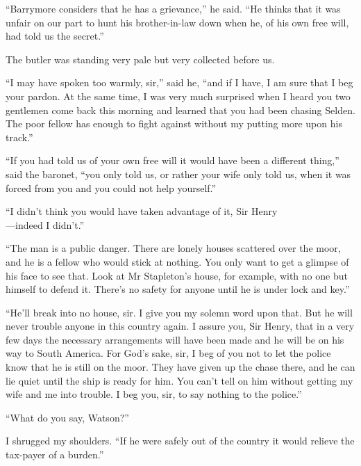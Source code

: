 \documentclass[paper=5.5in:8.5in,BCOR=7mm,twoside,DIV=calc,12pt,usegeometry,openany,chapterprefix,endperiod,headings=big]{scrbook} %
\begin{document}
\enquote{Barrymore considers that he has a grievance,} he said. \enquote{He thinks that it was unfair on our part to hunt his brother-in-law down when he, of his own free will, had told us the secret.}

The butler was standing very pale but very collected before us.


\enquote{I may have spoken too warmly, sir,} said he, \enquote{and if I have, I am sure that I beg your pardon. At the same time, I was very much surprised when I heard you two gentlemen come back this morning and learned that you had been chasing Selden. The poor fellow has enough to fight against without my putting more upon his track.}

\enquote{If you had told us of your own free will it would have been a different thing,} said the baronet, \enquote{you only told us, or rather your wife only told us, when it was forced from you and you could not help yourself.}

\enquote{I didn't think you would have taken advantage of it, Sir Henry\\ ---indeed I didn't.}

\enquote{The man is a public danger. There are lonely houses scattered over the moor, and he is a fellow who would stick at nothing. You only want to get a glimpse of his face to see that. Look at Mr Stapleton's house, for example, with no one but himself to defend it. There's no safety for anyone until he is under lock and key.}

\enquote{He'll break into no house, sir. I give you my solemn word upon that. But he will never trouble anyone in this country again. I assure you, Sir Henry, that in a very few days the necessary arrangements will have been made and he will be on his way to South America. For God's sake, sir, I beg of you not to let the police know that he is still on the moor. They have given up the chase there, and he can lie quiet until the ship is ready for him. You can't tell on him without getting my wife and me into trouble. I beg you, sir, to say nothing to the police.}

\enquote{What do you say, Watson?}

I shrugged my shoulders. \enquote{If he were safely out of the country it would relieve the tax-payer of a burden.}
\end{document}
